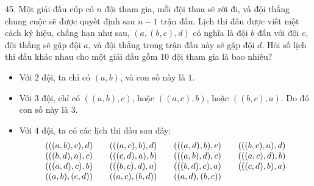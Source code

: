 \begin{problem}{45.}
	Một giải đấu cúp có $n$ đội tham gia, mỗi đội thua sẽ rời đi, và đội thắng chung cuộc sẽ được quyết định sau $n-1$ trận đấu. Lịch thi đấu được viết một cách ký hiệu, chẳng hạn như sau, $(a,(b,c),d)$ có nghĩa là đội $b$ đấu với đội $c$, đội thắng sẽ gặp đội $a$, và đội thắng trong trận đấu này sẽ gặp đội $d$. Hỏi số lịch thi đấu khác nhau cho một giải đấu gồm $10$ đội tham gia là bao nhiêu?

	\begin{itemize}
		\item Với $2$ đội, ta chỉ có $(a,b)$, và con số này là $1$.
		\item Với $3$ đội, chỉ có $((a,b),c)$, hoặc $ ((a,c),b)$, hoặc $ ((b,c),a)$. Do đó con số này là $3$.
		\item Với $4$ đội, ta có các lịch thi đấu sau đây:
			\begin{equation*}
				\begin{array}{@{}cccc@{}}
					(((a,b),c),d) & \quad\;(((a,c),b),d) & \quad\;(((a,d),b),c) & \quad\;(((b,c),a),d) \\
					(((b,d),a),c) & \quad\;(((c,d),a),b) & \quad\;(((a,b),d),c) & \quad\;(((a,c),d),b) \\ 
					(((a,d),c),b) & \quad\;(((b,c),d),a) & \quad\;(((b,d),c),a) & \quad\;(((c,d),b),a) \\
					((a,b),(c,d)) & \quad\;((a,c),(b,d)) & \quad\;((a,d),(b,c))
				\end{array}
			\end{equation*}
	\end{itemize}
\end{problem}

